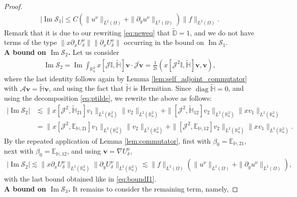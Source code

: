 \documentclass[report]{elsarticle}
\numberwithin{theorem}{section}
\renewcommand{\Im}{\operatorname{Im}}
\renewcommand{\vec}[1]{\mathbf{#1}}
\begin{document}
\begin{proof}
\begin{align}
	\label{eq:boundI1}
	\left|\Im \mathcal{S}_1\right|\leq C (\|u^{\nu}\|_{L^2(\Omega)}+\|\partial_y u^{\nu}\|_{L^2(\Omega)})\|f\|_{L^2(\Omega)}.
\end{align}
Remark that it is due to our rewriting \eqref{eq:neweq} that $\widetilde{\mathbb{D}}=1$, and we do not have terms of the type $\|x\partial_x U^{\nu}_{\delta}\|\|\partial_x U^{\nu}_{\delta}\|$ occurring in the bound on $\Im \mathcal{S}_1$.\\
\textbf{A bound on $\Im \mathcal{S}_2$. }
Let us consider
\begin{align}
	\label{eq:I2}
	\Im  \mathcal{S}_2=\operatorname{Im}\int_{\mathbb{R}^2_a}x[\mathcal{J}\mathbb{I}, \widetilde{\mathbb{H}}]\vec{v}\cdot\overline{\mathcal{J}\vec{v}}=\frac{1}{2i}
	\left(x[\mathcal{J}^2\mathbb{I}, \widetilde{\mathbb{H}}]\vec{v}, \vec{v}\right),
\end{align}
where the last identity follows again by Lemma \ref{lem:self_adjoint_commutator} with $\mathcal{A}\vec{v}=\widetilde{\mathbb{H}}\vec{v}$,  and using the fact that $\widetilde{\mathbb{H}}$ is Hermitian. 
Since $\operatorname{diag}\widetilde{\mathbb{H}}=0$, and using the decomposition \eqref{eq:ptilde}, we rewrite the above as follows:
\begin{align*}
	|\Im \mathcal{S}_2|&\lesssim \|x[\mathcal{J}^2, \widetilde{\mathbb{H}}_{21}]v_1\|_{L^2(\mathbb{R}^2_a)}\|v_2\|_{L^2(\mathbb{R}^2_a)}+\|[\mathcal{J}^2, \widetilde{\mathbb{H}}_{12}]v_2\|_{L^2(\mathbb{R}^2_a)}\|xv_1\|_{L^2(\mathbb{R}^2_a)}\\
	&=\|x[\mathcal{J}^2, \mathbb{E}_{\mathbb{H},21}]v_1\|_{L^2(\mathbb{R}^2_a)}\|v_2\|_{L^2(\mathbb{R}^2_a)}+\|[\mathcal{J}^2, \mathbb{E}_{\mathbb{H},12}]v_2\|_{L^2(\mathbb{R}^2_a)}\|xv_1\|_{L^2(\mathbb{R}^2_a)}.
\end{align*}
By the repeated application of Lemma \ref{lem:commutator}, first with $\beta_0=\mathbb{E}_{\mathbb{H},21}$, next with $\beta_0=\mathbb{E}_{\mathbb{H},12}$, and using $\vec{v}=\nabla U^{\nu}_{\delta}$,  
\begin{align}
	\label{eq:boundI2}
	|\Im \mathcal{S}_2|\lesssim \|x\partial_x U^{\nu}_{\delta}\|_{L^2(\mathbb{R}^2_a)}\|\partial_y U^{\nu}_{\delta}\|_{L^2(\mathbb{R}^2_a)}\lesssim \|f\|_{L^2(\Omega)}(\|u^{\nu}\|_{L^2(\Omega)}+\|\partial_y u^{\nu}\|_{L^2(\Omega)}),
\end{align}	
with the last bound obtained like in \eqref{eq:boundI1}.\\
\textbf{A bound on $\Im \mathcal{S}_3$. }It remains to consider the remaining term, namely,  

\end{proof}
\end{document}
